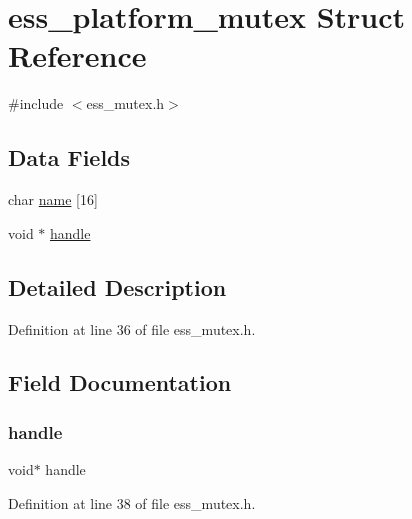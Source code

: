 \hypertarget{structess__platform__mutex}{}\section{ess\+\_\+platform\+\_\+mutex Struct Reference}
\label{structess__platform__mutex}


{\ttfamily \#include $<$ess\+\_\+mutex.\+h$>$}

\subsection*{Data Fields}
\begin{DoxyCompactItemize}
\item 
char \hyperlink{structess__platform__mutex_acd328517a6cf718155c2e6e22b671ca9}{name} \mbox{[}16\mbox{]}
\item 
void $\ast$ \hyperlink{structess__platform__mutex_a81011b79683fab64ce3aff71114f8fdd}{handle}
\end{DoxyCompactItemize}


\subsection{Detailed Description}


Definition at line 36 of file ess\+\_\+mutex.\+h.



\subsection{Field Documentation}
\mbox{\label{structess__platform__mutex_a81011b79683fab64ce3aff71114f8fdd}} 
\subsubsection{\texorpdfstring{handle}{handle}}
{\footnotesize\ttfamily void$\ast$ handle}



Definition at line 38 of file ess\+\_\+mutex.\+h.

\mbox{\label{structess__platform__mutex_acd328517a6cf718155c2e6e22b671ca9}} 
